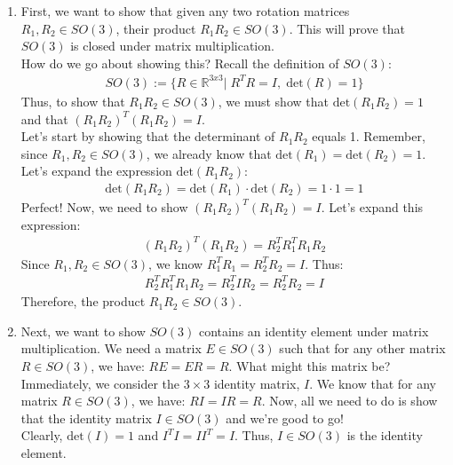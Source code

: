 \documentclass[oneside]{book}
\begin{document}
\begin{enumerate}
    \item First, we want to show that given any two rotation matrices $R_1, R_2 \in SO(3)$, their product $R_1R_2 \in SO(3)$. This will prove that $SO(3)$ is closed under matrix multiplication.\\
    How do we go about showing this? Recall the definition of $SO(3)$:
    \begin{align}
        SO(3) := \{R\in \mathbb{R}^{3x3}| \; R^TR = I,\; \mathrm{det}(R) = 1\}
    \end{align}
    Thus, to show that $R_1R_2\in SO(3)$, we must show that $\mathrm{det}(R_1R_2) = 1$ and that $(R_1R_2)^T(R_1R_2) = I$.\\
    Let's start by showing that the determinant of $R_1R_2$ equals 1. Remember, since $R_1, R_2 \in SO(3)$, we already know that $\mathrm{det}(R_1) = \mathrm{det}(R_2) = 1$. Let's expand the expression $\mathrm{det}(R_1R_2)$:
    \begin{align}
        \mathrm{det}(R_1R_2) = \mathrm{det}(R_1)\cdot \mathrm{det}(R_2) = 1\cdot 1 = 1
    \end{align}
    Perfect! Now, we need to show $(R_1R_2)^T(R_1R_2) = I$. Let's expand this expression:
    \begin{align}
        (R_1R_2)^T(R_1R_2) = R_2^TR_1^TR_1R_2
    \end{align}
    Since $R_1, R_2 \in SO(3)$, we know $R_1^TR_1 = R_2^TR_2 = I$. Thus:
    \begin{align}
        R_2^TR_1^TR_1R_2 = R_2^TIR_2 = R_2^TR_2 = I
    \end{align}
    Therefore, the product $R_1R_2 \in SO(3)$.
    
    \item Next, we want to show $SO(3)$ contains an identity element under matrix multiplication. We need a matrix $E\in SO(3)$ such that for any other matrix $R \in SO(3)$, we have: $RE = ER = R$. What might this matrix be?\\
    Immediately, we consider the $3\times 3$ identity matrix, $I$. We know that for any matrix $R \in SO(3)$, we have: $RI = IR = R$. Now, all we need to do is show that the identity matrix $I\in SO(3)$ and we're good to go!\\
    Clearly, $\mathrm{det}(I) = 1$ and $I^TI = II^T = I$. Thus, $I\in SO(3)$ is the identity element.
    

\end{enumerate}
\end{document}
